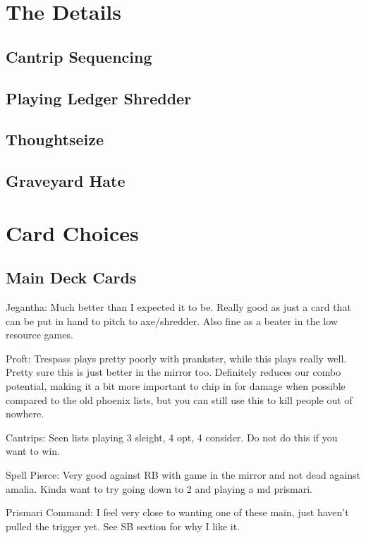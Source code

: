 \documentclass[12pt]{article}
\begin{document}
\clearpage
\section{The Details}
\subsection{Cantrip Sequencing}

\subsection{Playing Ledger Shredder}

\subsection{Thoughtseize}

\subsection{Graveyard Hate}

\clearpage
\section{Card Choices}
\subsection{Main Deck Cards}
\label{sec:mainchoices}
Jegantha:
Much better than I expected it to be. Really good as just a card that can be put in hand to pitch to axe/shredder. Also fine as a beater in the low resource games.

Proft:
Trespass plays pretty poorly with prankster, while this plays really well. Pretty sure this is just better in the mirror too. Definitely reduces our combo potential, making it a bit more important to chip in for damage when possible compared to the old phoenix lists, but you can still use this to kill people out of nowhere.

Cantrips:
Seen lists playing 3 sleight, 4 opt, 4 consider. Do not do this if you want to win.

Spell Pierce:
Very good against RB with game in the mirror and not dead against amalia. Kinda want to try going down to 2 and playing a md prismari.

Prismari Command:
I feel very close to wanting one of these main, just haven't pulled the trigger yet. See SB section for why I like it.
\end{document}
